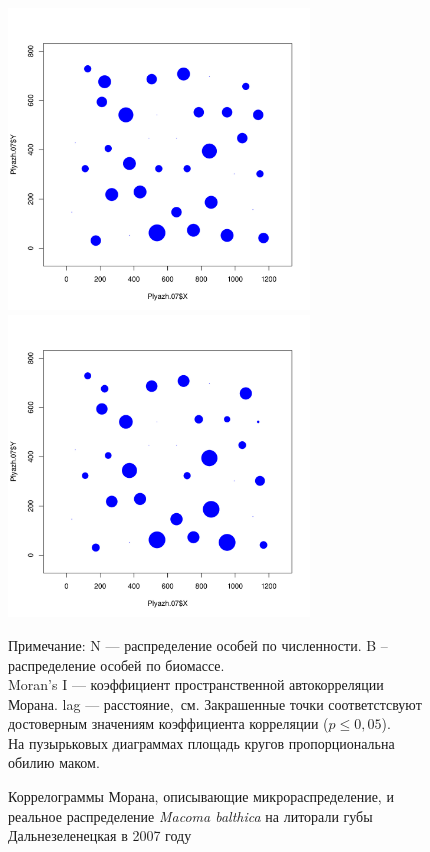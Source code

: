 \begin{figure}[h]
	\begin{minipage}[b]{.46\linewidth}
	\begin{center}
		\includegraphics[width=80mm]{../Barenc_Sea/distribution_Moran/Plyazh07_N_Macoma_bubbles.pdf}
	\end{center}
	\end{minipage}
	\hfil %
	\begin{minipage}[b]{.46\linewidth}
	\begin{center}
		\includegraphics[width=80mm]{../Barenc_Sea/distribution_Moran/Plyazh07_B_Macoma_bubbles.pdf}
	\end{center}
	\end{minipage}
	\caption{Коррелограммы Морана, описывающие микрораспределение, и реальное распределение {\it Macoma balthica} на литорали губы Дальнезеленецкая в 2007 году}
	\label{ris:MoranI_DZ_2007}

	\footnotesize{Примечание: N --- распределение особей по численности. B -- распределение особей по биомассе.\\
	Moran's I --- коэффициент пространственной автокорреляции Морана. lag --- расстояние,~см. Закрашенные точки соответстсвуют достоверным значениям коэффициента корреляции ($p \le 0,05$).\\
	На пузырьковых диаграммах площадь кругов пропорциональна обилию маком.}
	\end{figure}

